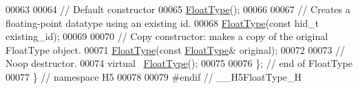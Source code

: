 \begin{DoxyCode}
00063 
00064         \textcolor{comment}{// Default constructor}
00065         \hyperlink{class_h5_1_1_float_type}{FloatType}();
00066 
00067         \textcolor{comment}{// Creates a floating-point datatype using an existing id.}
00068         \hyperlink{class_h5_1_1_float_type}{FloatType}(\textcolor{keyword}{const} hid\_t existing\_id);
00069 
00070         \textcolor{comment}{// Copy constructor: makes a copy of the original FloatType object.}
00071         \hyperlink{class_h5_1_1_float_type}{FloatType}(\textcolor{keyword}{const} \hyperlink{class_h5_1_1_float_type}{FloatType}& original);
00072 
00073         \textcolor{comment}{// Noop destructor.}
00074         \textcolor{keyword}{virtual} ~\hyperlink{class_h5_1_1_float_type}{FloatType}();
00075 
00076 \}; \textcolor{comment}{// end of FloatType}
00077 \} \textcolor{comment}{// namespace H5}
00078 
00079 \textcolor{preprocessor}{#endif // \_\_H5FloatType\_H}
\end{DoxyCode}
